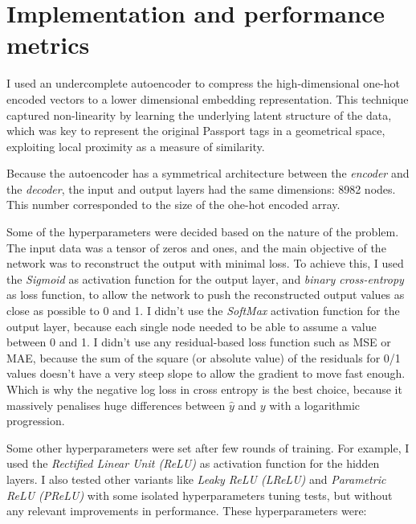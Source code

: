 
\section{Implementation and performance metrics}

I used an undercomplete autoencoder to compress the high-dimensional one-hot encoded vectors to a lower dimensional embedding representation.
This technique captured non-linearity by learning the underlying latent structure of the data, which was key to represent the original
Passport tags in a geometrical space, exploiting local proximity as a measure of similarity.

Because the autoencoder has a symmetrical architecture between the \textit{encoder} and the \textit{decoder}, the input and output layers
had the same dimensions: 8982 nodes. This number corresponded to the size of the ohe-hot encoded array.

Some of the hyperparameters were decided based on the nature of the problem. The input data was a tensor of zeros and ones,
and the main objective of the network was to reconstruct the output with minimal loss.
To achieve this, I used the \textit{Sigmoid} as activation function for the output layer, and \textit{binary cross-entropy} as loss function,
to allow the network to push the reconstructed output values as close as possible to 0 and 1.
I didn't use the \textit{SoftMax} activation function for the output layer, because each single node needed to be able to assume a value between 0 and 1.
I didn't use any residual-based loss function such as MSE or MAE, because the sum of the square (or absolute value) of the residuals for 0/1 values
doesn't have a very steep slope to allow the gradient to move fast enough. Which is why the negative log loss in cross entropy is the best choice,
because it massively penalises huge differences between $\hat{y}$ and $y$ with a logarithmic progression.

Some other hyperparameters were set after few rounds of training. For example, I used the \textit{Rectified Linear Unit (ReLU)} as activation function
for the hidden layers. I also tested other variants like \textit{Leaky ReLU (LReLU)} and \textit{Parametric ReLU (PReLU)}
with some isolated hyperparameters tuning tests, but without any relevant improvements in performance. These hyperparameters were:

